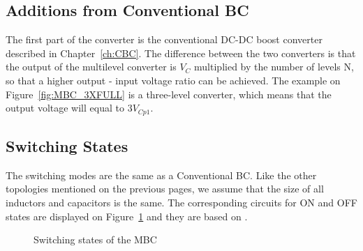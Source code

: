 \subsection{Additions from Conventional BC}
The first part of the converter is the conventional DC-DC boost converter described in Chapter~\ref{ch:CBC}. The difference between the two converters is that the output of the multilevel converter is $V_C$ multiplied by the number of levels N, so that a higher output - input voltage ratio can be achieved. The example on Figure~\ref{fig:MBC_3XFULL} is a three-level converter, which means that the output voltage will equal to $3V_{Cp1}$. 

\subsection{Switching States}
The switching modes are the same as a Conventional BC. Like the other topologies mentioned on the previous pages, we assume that the size of all inductors and capacitors is the same. The corresponding circuits for ON and OFF states are displayed on Figure~\ref{fig:MBC_States} and they are based on \cite{Rosas-Caro2008}.

\begin{figure}[H]%
    \centering
    \qquad
    \caption{Switching states of the MBC}%
     \label{fig:MBC_States}%
\end{figure}


